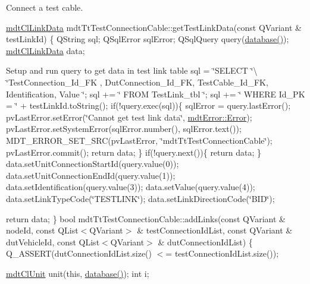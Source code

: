 Connect a test cable. 

\hyperlink{classmdt_cl_link_data}{mdt\-Cl\-Link\-Data} mdt\-Tt\-Test\-Connection\-Cable\-::get\-Test\-Link\-Data(const Q\-Variant \& test\-Link\-Id) \{ Q\-String sql; Q\-Sql\-Error sql\-Error; Q\-Sql\-Query query(\hyperlink{classmdt_tt_base_a82c3f795b6cb8101b12e0e0ef340c1be}{database()}); \hyperlink{classmdt_cl_link_data}{mdt\-Cl\-Link\-Data} data;

Setup and run query to get data in test link table sql = \char`\"{}\-S\-E\-L\-E\-C\-T \char`\"{}\textbackslash{} \char`\"{}\-Test\-Connection\-\_\-\-Id\-\_\-\-F\-K , Dut\-Connection\-\_\-\-Id\-\_\-\-F\-K, Test\-Cable\-\_\-\-Id\-\_\-\-F\-K, Identification, Value \char`\"{}; sql += \char`\"{} F\-R\-O\-M Test\-Link\-\_\-tbl \char`\"{}; sql += \char`\"{} W\-H\-E\-R\-E Id\-\_\-\-P\-K = \char`\"{} + test\-Link\-Id.\-to\-String(); if(!query.exec(sql))\{ sql\-Error = query.\-last\-Error(); pv\-Last\-Error.\-set\-Error(\char`\"{}\-Cannot get test link data\char`\"{}, \hyperlink{classmdt_error_a5c8b1a040e2feaa848f6201d6b6f0cd7a35f5c05a7d15b6433445cdbffa6d5260}{mdt\-Error\-::\-Error}); pv\-Last\-Error.\-set\-System\-Error(sql\-Error.\-number(), sql\-Error.\-text()); M\-D\-T\-\_\-\-E\-R\-R\-O\-R\-\_\-\-S\-E\-T\-\_\-\-S\-R\-C(pv\-Last\-Error, \char`\"{}mdt\-Tt\-Test\-Connection\-Cable\char`\"{}); pv\-Last\-Error.\-commit(); return data; \} if(!query.next())\{ return data; \} data.\-set\-Unit\-Connection\-Start\-Id(query.\-value(0)); data.\-set\-Unit\-Connection\-End\-Id(query.\-value(1)); data.\-set\-Identification(query.\-value(3)); data.\-set\-Value(query.\-value(4)); data.\-set\-Link\-Type\-Code(\char`\"{}\-T\-E\-S\-T\-L\-I\-N\-K\char`\"{}); data.\-set\-Link\-Direction\-Code(\char`\"{}\-B\-I\-D\char`\"{});

return data; \} bool mdt\-Tt\-Test\-Connection\-Cable\-::add\-Links(const Q\-Variant \& node\-Id, const Q\-List$<$\-Q\-Variant$>$ \& test\-Connection\-Id\-List, const Q\-Variant \& dut\-Vehicle\-Id, const Q\-List$<$\-Q\-Variant$>$ \& dut\-Connection\-Id\-List) \{ Q\-\_\-\-A\-S\-S\-E\-R\-T(dut\-Connection\-Id\-List.\-size() $<$= test\-Connection\-Id\-List.\-size());

\hyperlink{classmdt_cl_unit}{mdt\-Cl\-Unit} unit(this, \hyperlink{classmdt_tt_base_a82c3f795b6cb8101b12e0e0ef340c1be}{database()}); int i;

